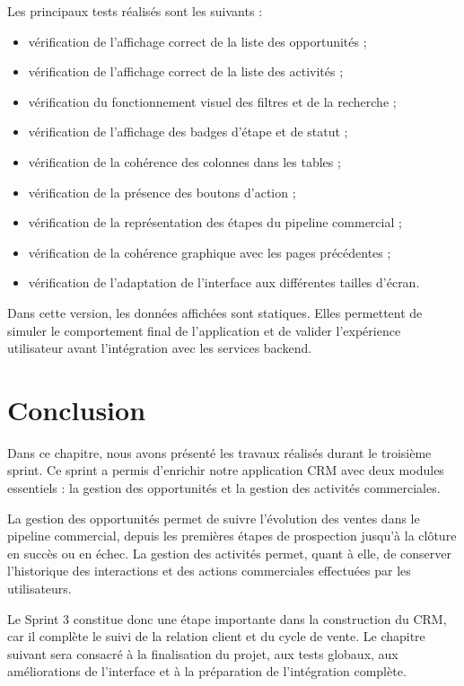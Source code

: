 \documentclass[12pt,a4paper]{report}
\begin{document}
Les principaux tests réalisés sont les suivants :

\begin{itemize}
    \item vérification de l’affichage correct de la liste des opportunités ;
    \item vérification de l’affichage correct de la liste des activités ;
    \item vérification du fonctionnement visuel des filtres et de la recherche ;
    \item vérification de l’affichage des badges d’étape et de statut ;
    \item vérification de la cohérence des colonnes dans les tables ;
    \item vérification de la présence des boutons d’action ;
    \item vérification de la représentation des étapes du pipeline commercial ;
    \item vérification de la cohérence graphique avec les pages précédentes ;
    \item vérification de l’adaptation de l’interface aux différentes tailles d’écran.
\end{itemize}

Dans cette version, les données affichées sont statiques. Elles permettent de simuler le comportement final de l’application et de valider l’expérience utilisateur avant l’intégration avec les services backend.

\section*{Conclusion}

Dans ce chapitre, nous avons présenté les travaux réalisés durant le troisième sprint. Ce sprint a permis d’enrichir notre application CRM avec deux modules essentiels : la gestion des opportunités et la gestion des activités commerciales.

La gestion des opportunités permet de suivre l’évolution des ventes dans le pipeline commercial, depuis les premières étapes de prospection jusqu’à la clôture en succès ou en échec. La gestion des activités permet, quant à elle, de conserver l’historique des interactions et des actions commerciales effectuées par les utilisateurs.

Le Sprint 3 constitue donc une étape importante dans la construction du CRM, car il complète le suivi de la relation client et du cycle de vente. Le chapitre suivant sera consacré à la finalisation du projet, aux tests globaux, aux améliorations de l’interface et à la préparation de l’intégration complète.
\end{document}
